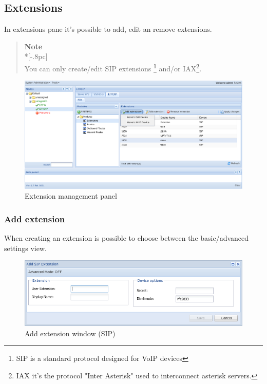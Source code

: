\subsection{Extensions}

In extensions pane it's possible to add, edit an remove extensions.

\begin{quote}
	{\large \bf Note} \\*[-.8pc]
	\underline{\hspace{6in}} \\
    You can only create/edit SIP extensions \footnote{SIP is a standard protocol designed for VoIP devices} and/or IAX\footnote {IAX it's the protocol "Inter Asterisk" used to interconnect asterisk servers.}.
\end{quote}

\begin{figure}[H]
        \begin{center}
        \includegraphics[scale=0.45]{screenshots/etvoip_pbx_extensions.png}
        \caption{Extension management panel}
        \label{fig:etvoip_pbx_extensions}
        \end{center}
\end{figure}


\subsubsection{Add extension}
\label{sec:etvoip_pbx_extensions_add}
When creating an extension is possible to choose between the basic/advanced settings view.

\begin{figure}[H]
        \begin{center}
        \includegraphics[scale=0.6]{screenshots/etvoip_pbx_extensions_sip.png}
        \caption{Add extension window (SIP)}
        \label{fig:etvoip_pbx_extensions_sip}
        \end{center}
\end{figure}


